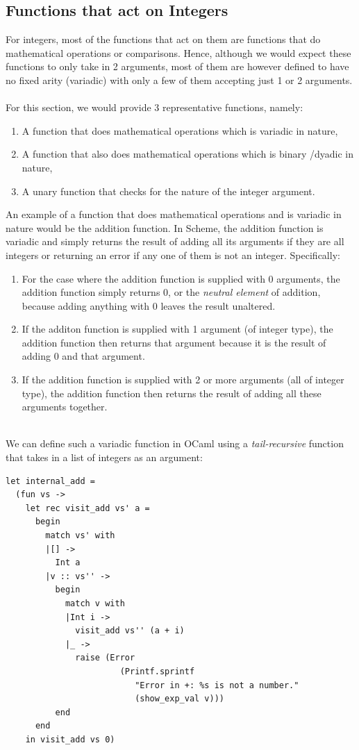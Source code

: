 \subsection{Functions that act on Integers}
For integers, most of the functions that act on them are functions that do mathematical operations or comparisons. Hence, although we would expect these functions to only take in 2 arguments, most of them are however 
defined to have no fixed arity (variadic) with only a few of them accepting just 1 or 2 arguments.
\\ 
\\
For this section, we would provide 3 representative functions, namely:
\begin{enumerate}
   \item A function that does mathematical operations which is variadic in nature, 
   \item A function that also does mathematical operations which is binary /dyadic in nature,
   \item A unary function that checks for the nature of the integer argument.
\end{enumerate}
An example of a function that does mathematical operations and is variadic in nature would be the addition function. In Scheme, the addition function is variadic and simply returns the result of adding all its arguments 
if they are all integers or returning an error if any one of them is not an integer. Specifically: 
\begin{enumerate}
   \item For the case where the addition function is supplied with 0 arguments, the addition function simply returns 0, or the \textit{neutral element} of addition, because adding anything with 0 leaves the result unaltered.
   \item If the additon function is supplied with 1 argument (of integer type), the addition function then returns that argument because it is the result of adding 0 and that argument.
   \item If the addition function is supplied with 2 or more arguments (all of integer type), the addition function then returns the result of adding all these arguments together.
\end{enumerate}
\\ 
We can define such a variadic function in OCaml using a \textit{tail-recursive} function that takes in a list of integers as an argument:
\begin{scriptsize}
\begin{verbatim}
let internal_add =
  (fun vs ->
    let rec visit_add vs' a =
      begin
        match vs' with
        |[] ->
          Int a
        |v :: vs'' ->
          begin
            match v with
            |Int i ->
              visit_add vs'' (a + i)
            |_ ->
              raise (Error
                       (Printf.sprintf
                          "Error in +: %s is not a number."
                          (show_exp_val v)))
          end
      end
    in visit_add vs 0)
\end{verbatim}
\end{scriptsize}
